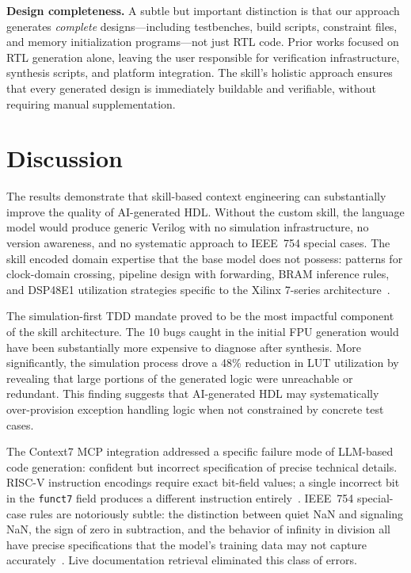 \documentclass[journal]{IEEEtran}
\begin{document}
\textbf{Design completeness.}  A subtle but important distinction is
that our approach generates \emph{complete} designs---including
testbenches, build scripts, constraint files, and memory initialization
programs---not just RTL code.  Prior works focused on RTL generation
alone, leaving the user responsible for verification infrastructure,
synthesis scripts, and platform integration.  The skill's holistic
approach ensures that every generated design is immediately buildable
and verifiable, without requiring manual supplementation.


\section{Discussion}
\label{sec:discussion}

The results demonstrate that skill-based context engineering can
substantially improve the quality of AI-generated HDL.  Without the
custom skill, the language model would produce generic Verilog with no
simulation infrastructure, no version awareness, and no systematic
approach to IEEE~754 special cases.  The skill encoded domain expertise
that the base model does not possess: patterns for clock-domain crossing,
pipeline design with forwarding, BRAM inference rules, and DSP48E1
utilization strategies specific to the Xilinx 7-series
architecture~\cite{xilinx2020ds180}.

The simulation-first TDD mandate proved to be the most impactful
component of the skill architecture.  The 10 bugs caught in the initial
FPU generation would have been substantially more expensive to diagnose
after synthesis.  More significantly, the simulation process drove a 48\%
reduction in LUT utilization by revealing that large portions of the
generated logic were unreachable or redundant.  This finding suggests
that AI-generated HDL may systematically over-provision exception
handling logic when not constrained by concrete test cases.

The Context7 MCP integration addressed a specific failure mode of
LLM-based code generation: confident but incorrect specification of
precise technical details.  RISC-V instruction encodings require exact
bit-field values; a single incorrect bit in the \texttt{funct7} field
produces a different instruction
entirely~\cite{waterman2019riscv}.  IEEE~754 special-case rules are
notoriously subtle: the distinction between quiet NaN and signaling NaN,
the sign of zero in subtraction, and the behavior of infinity in
division all have precise specifications that the model's training data
may not capture accurately~\cite{ieee754_2019}.  Live documentation
retrieval eliminated this class of errors.
\end{document}
